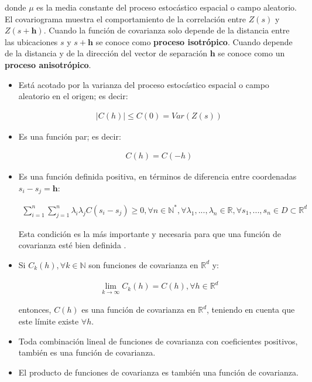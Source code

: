 \documentclass[
]{book}
\begin{document}
donde \(\mu\) es la media constante del proceso estocástico espacial o campo aleatorio. El covariograma muestra el comportamiento de la correlación entre \(Z(s)\) y \(Z(s+\textbf{h})\). Cuando la función de covarianza solo depende de la distancia entre las ubicaciones \(s\) y \(s+\textbf{h}\) se conoce como \textbf{proceso isotrópico}. Cuando depende de la distancia y de la dirección del vector de separación \(\textbf{h}\) se conoce como un \textbf{proceso anisotrópico}.

\begin{itemize}
\item
  Está acotado por la varianza del proceso estocástico espacial o campo aleatorio en el origen; es decir:

  \begin{align*}
      |C(h)|\leq C(0)=Var(Z(s))  
    \end{align*}
\item
  Es una función par; es decir:

  \begin{align*}
      C(h)=C(-h)  
    \end{align*}
\item
  Es una función definida positiva, en términos de diferencia entre coordenadas \(s_i-s_j=\textbf{h}\):

  \begin{align*}
      \sum_{i=1}^n \sum_{j=1}^n\lambda_i \lambda_j C(s_i-s_j)\geq 0,\forall n\in \mathbb{N}^*,\forall \lambda_1,...,\lambda_n \in \mathbb{R}, \forall s_1,...,s_n\in D \subset \mathbb{R}^d  
    \end{align*}

  Esta condición es la más importante y necesaria para que una función de covarianza esté bien definida \citep{montero}.
\item
  Si \(C_k(h),\forall k \in \mathbb{N}\) son funciones de covarianza en \(\mathbb{R}^d\) y:

  \begin{align*}
      \lim_{k\to \infty}C_{k}(h)=C(h),\forall h \in \mathbb{R}^d  
    \end{align*}

  entonces, \(C(h)\) es una función de covarianza en \(\mathbb{R}^d\), teniendo en cuenta que este límite existe \(\forall h\).
\item
  Toda combinación lineal de funciones de covarianza con coeficientes positivos, también es una función de covarianza.
\item
  El producto de funciones de covarianza es también una función de covarianza.
\end{itemize}
\end{document}

